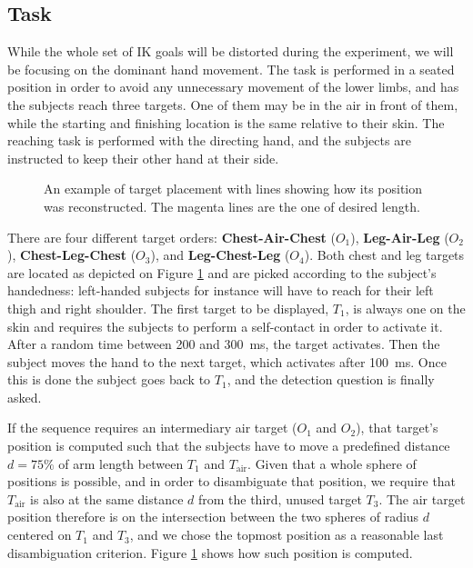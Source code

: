 \subsection{Task}
\label{sec:task}
While the whole set of IK goals will be distorted during the experiment, we will be focusing on the dominant hand movement. The task is performed in a seated position in order to avoid any unnecessary movement of the lower limbs, and has the subjects reach three targets. One of them may be in the air in front of them, while the starting and finishing location is the same relative to their skin. The reaching task is performed with the directing hand, and the subjects are instructed to keep their other hand at their side.

\begin{figure}
    \caption{An example of target placement with lines showing how its position was reconstructed. The magenta lines are the one of desired length.}\label{fig:targetPlacement}
\end{figure}

There are four different target orders: \textbf{Chest-Air-Chest} ($O_1$), \textbf{Leg-Air-Leg} ($O_2$), \textbf{Chest-Leg-Chest} ($O_3$), and \textbf{Leg-Chest-Leg} ($O_4$). Both chest and leg targets are located as depicted on Figure \ref{fig:targetPlacement} and are picked according to the subject's handedness: left-handed subjects for instance will have to reach for their left thigh and right shoulder. The first target to be displayed, $T_1$, is always one on the skin and requires the subjects to perform a self-contact in order to activate it. After a random time between \num{200} and \SI{300}{\milli\second}, the target activates. Then the subject moves the hand to the next target, which activates after \SI{100}{\milli\second}. Once this is done the subject goes back to $T_1$, and the detection question is finally asked.

If the sequence requires an intermediary air target ($O_1$ and $O_2$), that target's position is computed such that the subjects have to move a predefined distance $d = 75\%$ of arm length between $T_1$ and $T_{\text{air}}$. Given that a whole sphere of positions is possible, and in order to disambiguate that position, we require that $T_\text{air}$ is also at the same distance $d$ from the third, unused target $T_3$. The air target position therefore is on the intersection between the two spheres of radius $d$ centered on $T_1$ and $T_3$, and we chose the topmost position as a reasonable last disambiguation criterion. Figure \ref{fig:targetPlacement} shows how such position is computed.

